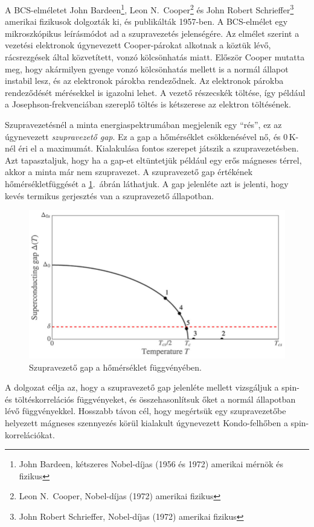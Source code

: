 \documentclass[a4paper,12pt,titlepage]{article}
\begin{document}
A BCS-elméletet John Bardeen\footnote{John Bardeen, kétszeres Nobel-díjas (1956 és 1972) amerikai mérnök és fizikus}, Leon N.\ Cooper\footnote{Leon N.\ Cooper, Nobel-díjas (1972) amerikai fizikus} és John Robert Schrieffer\footnote{John Robert Schrieffer, Nobel-díjas (1972) amerikai fizikus} amerikai fizikusok dolgozták ki, és publikálták 1957-ben.  A BCS-elmélet egy mikroszkópikus leírásmódot ad a szupravezetés jelenségére.  Az elmélet szerint a vezetési elektronok úgynevezett Cooper-párokat alkotnak a köztük lévő, rácsrezgések által közvetített, vonzó kölcsönhatás miatt.  Először Cooper mutatta meg, hogy akármilyen gyenge vonzó kölcsönhatás mellett is a normál állapot instabil lesz, és az elektronok párokba rendeződnek.  Az elektronok párokba rendeződését mérésekkel is igazolni lehet.  A vezető részecskék töltése, így például a Josephson-frekvenciában szereplő töltés is kétszerese az elektron töltésének.

Szupravezetésnél a minta energiaspektrumában megjelenik egy \enquote{rés}, ez az úgynevezett \emph{szupravezető gap}.  Ez a gap a hőmérséklet csökkenésével nő, és $0$\,K-nél éri el a maximumát.  Kialakulása fontos szerepet játszik a szupravezetésben.  Azt tapasztaljuk, hogy ha a gap-et eltüntetjük például egy erős mágneses térrel, akkor a minta már nem szupravezet.  A szupravezető gap értékének hőmérsékletfüggését a \ref{sc-gap}.\ ábrán láthatjuk.  A gap jelenléte azt is jelenti, hogy kevés termikus gerjesztés van a szupravezető állapotban.

\begin{figure}[h!]
	\centering
	\includegraphics[width=12cm]{sc_gap.png}
	\caption{Szupravezető gap a hőmérséklet függvényében. \cite{superconductor-gap}}
	\label{sc-gap}
\end{figure}

\newpage

A dolgozat célja az, hogy a szupravezető gap jelenléte mellett vizsgáljuk a spin- és töltéskorrelációs függvényeket, és összehasonlítsuk őket a normál állapotban lévő függvényekkel.  Hosszabb távon cél, hogy megértsük egy szupravezetőbe helyezett mágneses szennyezés körül kialakult úgynevezett Kondo-felhőben a spin-korrelációkat.
\end{document}
